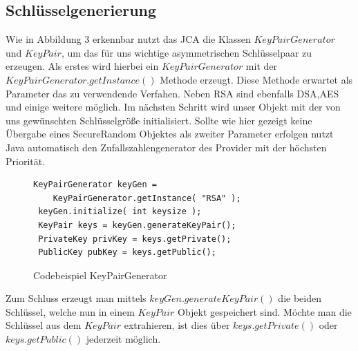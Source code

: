 \documentclass[paper=a4,11pt,german]{scrartcl} %
\begin{document}
\subsection{Schlüsselgenerierung}
Wie in Abbildung 3 erkennbar nutzt das JCA die Klassen $KeyPairGenerator$ und $KeyPair$, um das für uns wichtige asymmetrischen Schlüsselpaar zu erzeugen. Als erstes wird hierbei ein $KeyPairGenerator$ mit der $KeyPairGenerator.getInstance()$ Methode erzeugt. Diese Methode erwartet als Parameter das zu verwendende Verfahen. Neben RSA sind ebenfalls DSA,AES und einige weitere möglich.
Im nächsten Schritt wird unser Objekt mit der von uns gewünschten Schlüsselgröße initialisiert. Sollte wie hier gezeigt keine Übergabe eines SecureRandom Objektes als zweiter Parameter erfolgen nutzt Java automatisch den Zufallszahlengenerator des Provider mit der höchsten Priorität.  
\begin{figure}[h]
\caption{Codebeispiel KeyPairGenerator}
\begin{lstlisting}[frame=shadowbox]
 KeyPairGenerator keyGen = 
 	KeyPairGenerator.getInstance( "RSA" );
 keyGen.initialize( int keysize );
 KeyPair keys = keyGen.generateKeyPair();
 PrivateKey privKey = keys.getPrivate();
 PublicKey pubKey = keys.getPublic();
\end{lstlisting}
\label{KeyPairGenerator}
\end{figure}
Zum Schluss erzeugt man mittels $keyGen.generateKeyPair()$ die beiden Schlüssel, welche nun in einem $KeyPair$ Objekt gespeichert sind. Möchte man die Schlüssel aus dem $KeyPair$ extrahieren, ist dies über $keys.getPrivate()$ oder $keys.getPublic()$ jederzeit möglich.
\end{document}
